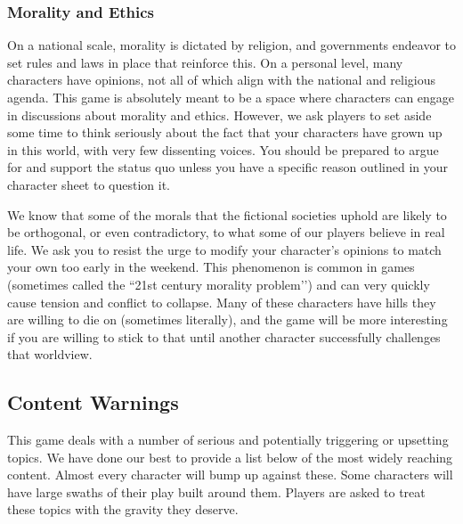 \documentclass[sheet]{GL2020}
\begin{document}
\subsubsection{Morality and Ethics}
On a national scale, morality is dictated by religion, and governments endeavor to set rules and laws in place that reinforce this. On a personal level, many characters have opinions, not all of which align with the national and religious agenda. This game is absolutely meant to be a space where characters can engage in discussions about morality and ethics. However, we ask players to set aside some time to think seriously about the fact that your characters have grown up in this world, with very few dissenting voices. You should be prepared to argue for and support the status quo unless you have a specific reason outlined in your character sheet to question it.

We know that some of the morals that the fictional societies uphold are likely to be orthogonal, or even contradictory, to what some of our players believe in real life. We ask you to resist the urge to modify your character’s opinions to match your own too early in the weekend. This phenomenon is common in games (sometimes called the ``21st century morality problem’’) and can very quickly cause tension and conflict to collapse. Many of these characters have hills they are willing to die on (sometimes literally), and the game will be more interesting if you are willing to stick to that until another character successfully challenges that worldview. 

\subsection{Content Warnings}
This game deals with a number of serious and potentially triggering or upsetting topics. We have done our best to provide a list below of the most widely reaching content. Almost every character will bump up against these. Some characters will have large swaths of their play built around them. Players are asked to treat these topics with the gravity they deserve.
\end{document}
